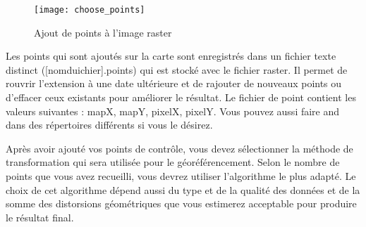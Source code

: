 \begin{enumerate}
\begin{enumerate}

\begin{figure}[ht]
\begin{center}
  \caption{Ajout de points à l'image raster \nixcaption}\label{fig:choose_points}\smallskip
  \texttt{[image: choose\_points]}
\end{center}
\end{figure}


Les points qui sont ajoutés sur la carte sont enregistrés dans un fichier texte distinct ([nomduichier].points) qui est stocké avec le fichier raster. Il permet de rouvrir l'extension à une date ultérieure et de rajouter de nouveaux points ou d'effacer ceux existants pour améliorer le résultat. Le fichier de  point contient les valeurs suivantes : mapX, mapY, pixelX, pixelY. Vous pouvez aussi faire  and  dans des répertoires différents si vous le désirez.

\label{georeferencer_transformation}


Après avoir ajouté vos points de contrôle, vous devez sélectionner la méthode de transformation qui sera utilisée pour le géoréférencement. Selon le nombre de points que vous avez recueilli, vous devrez utiliser l'algorithme le plus adapté. Le choix de cet algorithme dépend aussi du type et de la qualité des données et de la somme des distorsions géométriques que vous estimerez acceptable pour produire le résultat final.


\end{enumerate}
\end{enumerate}
